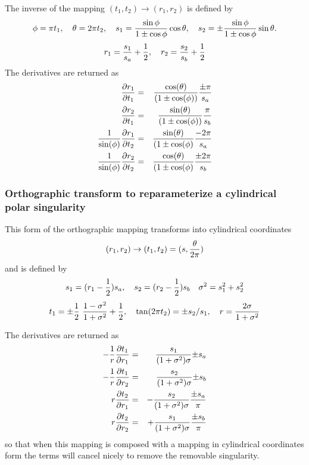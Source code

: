 The inverse of the mapping $(t_1,t_2)\rightarrow (r_1,r_2)$ is defined by
\[
 \phi = \pi t_1, \quad \theta = 2\pi t_2, \quad
 s_1={\sin\phi\over1\pm\cos\phi}\cos\theta,\quad
 s_2=\pm{\sin\phi\over1\pm\cos\phi}\sin\theta.
\]
\[
 r_1={s_1\over s_a}+\half , \quad  r_2={s_2\over s_b}+\half
\]
The derivatives are returned as
\begin{eqnarray*}
{\partial r_1 \over \partial t_1 } &=& {\cos(\theta) \over (1\pm\cos(\phi))} {\pm \pi \over s_a}  \\
{\partial r_2 \over \partial t_1 } &=& {\sin(\theta) \over (1\pm\cos(\phi))} {\pi \over s_b}  \\
{1\over\sin(\phi)}{\partial r_1\over\partial t_2} &=& {\sin(\theta)\over(1\pm\cos(\phi)} {-2\pi\over s_a}  \\
{1\over\sin(\phi)}{\partial r_2\over \partial t_2}&=&{\cos(\theta) \over (1\pm\cos(\phi)}{\pm 2\pi \over s_b}  
\end{eqnarray*}

\subsubsection{Orthographic transform to reparameterize a cylindrical polar singularity}

This form of the orthographic mapping transforms into cylindrical coordinates
\[
      (r_1,r_2) \rightarrow (t_1,t_2) = (s,{\theta\over 2\pi})
\]
and is defined by
\[
      s_1 = (r_1-{1\over2}) s_a, \quad s_2 = ( r_2 - {1\over2} ) s_b
    \quad \ss^2=s_1^2 + s_2^2
\]
\[
 t_1 = \pm\half ~{1-\ss^2\over 1+\ss^2}+\half,\quad
 \tan(2\pi t_2) = \pm s_2/s_1, \quad  r = {2 \ss\over 1+\ss^2}  
\]

The derivatives are returned as
\begin{eqnarray*}
-{1\over r} {\partial t_1 \over \partial r_1 } &=& {s_1 \over (1+\ss^2) \ss } {\pm s_a }  \\
-{1\over r} {\partial t_1 \over \partial r_2 } &=& {s_2 \over (1+\ss^2) \ss } {\pm s_b }  \\
r {\partial t_2 \over \partial r_1 } &=& -{s_2 \over (1+\ss^2) \ss } {\pm s_a\over \pi}  \\
r {\partial t_2 \over \partial r_2 } &=& +{s_1 \over (1+\ss^2) \ss } {\pm s_b\over \pi}  
\end{eqnarray*}
so that when this mapping is composed with a mapping in cylindrical coordinates form the
terms will cancel nicely to remove the removable singularity.

